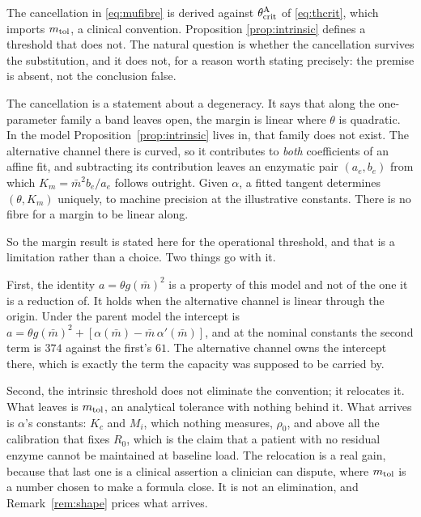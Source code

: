 \begin{remark}
\label{rem:which_threshold}
The cancellation in \eqref{eq:mufibre} is derived against $\theta_{\mathrm{crit}}^{\mathrm{A}}$ of
\eqref{eq:thcrit}, which imports $m_{\mathrm{tol}}$, a clinical convention. Proposition
\ref{prop:intrinsic} defines a threshold that does not. The natural question is whether the
cancellation survives the substitution, and it does not, for a reason worth stating
precisely: the premise is absent, not the conclusion false.

The cancellation is a statement about a degeneracy. It says that along the one-parameter
family a band leaves open, the margin is linear where $\theta$ is quadratic. In the model
Proposition~\ref{prop:intrinsic} lives in, that family does not exist. The alternative
channel there is curved, so it contributes to \emph{both} coefficients of an affine fit, and
subtracting its contribution leaves an enzymatic pair $(a_e, b_e)$ from which
$K_m = \bar m^2 b_e/a_e$ follows outright. Given $\alpha$, a fitted tangent determines
$(\theta, K_m)$ uniquely, to machine precision at the illustrative constants. There is no
fibre for a margin to be linear along.

So the margin result is stated here for the operational threshold, and that is a limitation
rather than a choice. Two things go with it.

First, the identity $a = \theta g(\bar m)^2$ is a property of this model and not of
the one it is a reduction of. It holds when the alternative channel is linear through the
origin. Under the parent model the intercept is
$a = \theta g(\bar m)^2 + [\alpha(\bar m) - \bar m\,\alpha'(\bar m)]$, and at the nominal
constants the second term is $374$ against the first's $61$. The alternative channel owns
the intercept there, which is exactly the term the capacity was supposed to be carried by.

Second, the intrinsic threshold does not eliminate the convention; it relocates
it. What leaves is $m_{\mathrm{tol}}$, an analytical tolerance with nothing behind it. What arrives is
$\alpha$'s constants: $K_c$ and $M_i$, which nothing measures, $\rho_0$, and above all the
calibration that fixes $R_0$, which is the claim that a patient with no residual enzyme
cannot be maintained at baseline load. The relocation is a real gain, because that last one
is a clinical assertion a clinician can dispute, where $m_{\mathrm{tol}}$ is a number chosen to make a
formula close. It is not an elimination, and Remark~\ref{rem:shape} prices what arrives.
\end{remark}

